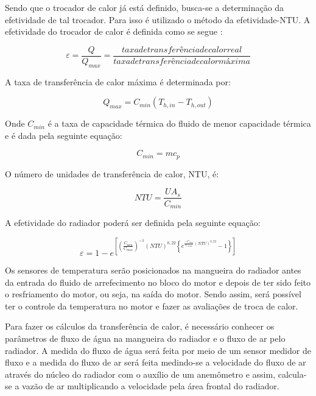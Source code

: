 Sendo que o trocador de calor já está definido, busca-se a determinação da efetividade de tal trocador. Para isso é utilizado o método da efetividade-NTU. A efetividade do trocador de calor é definida como se segue \cite{energiaTransferencia}:

\begin{equation}
	\varepsilon = \frac{Q}{Q_{max}} = \frac{taxa de transferência de calor real}{taxa de transferência de calor máxima}
\end{equation}

A taxa de transferência de calor máxima é determinada por:

\begin{equation}
	Q_{max} = C_{min} (T_{h, in} - T_{h, out})
\end{equation}

Onde $C_{min}$ é a taxa de capacidade térmica do fluido de menor capacidade térmica e é dada pela seguinte equação:

\begin{equation}
	C_{min} = mc_{p}
\end{equation}

O número de unidades de transferência de calor, NTU, é:

\begin{equation}
	NTU = \frac{UA_{s}}{C_{min}}
\end{equation}

A efetividade do radiador poderá ser definida pela seguinte equação:

\begin{equation}
	\varepsilon = 1 - e^{\left [ \left ( \frac{C_{min}}{C_{max}} \right ) ^{-1} \left ( NTU \right ) ^{0,22} \left \{ e^{\frac{-C_{min}}{C_{max}} \left ( NTU \right ) ^{0,22}} -1 \right \} \right ]}
\end{equation}

Os sensores de temperatura serão posicionados na mangueira do radiador antes da entrada do fluido de arrefecimento no bloco do motor e depois de ter sido feito o resfriamento do motor, ou seja, na saída do motor. Sendo assim, será possível ter o controle da temperatura no motor e fazer as avaliações de troca de calor.

Para fazer os cálculos da transferência de calor, é necessário conhecer os parâmetros de fluxo de água na mangueira do radiador e o fluxo de ar pelo radiador. A medida do fluxo de água será feita por meio de um sensor medidor de fluxo e a medida do fluxo de ar será feita medindo-se a velocidade do fluxo de ar através do núcleo do radiador com o auxílio de um anemômetro e assim, calcula-se a vazão de ar multiplicando a velocidade pela área frontal do radiador.

